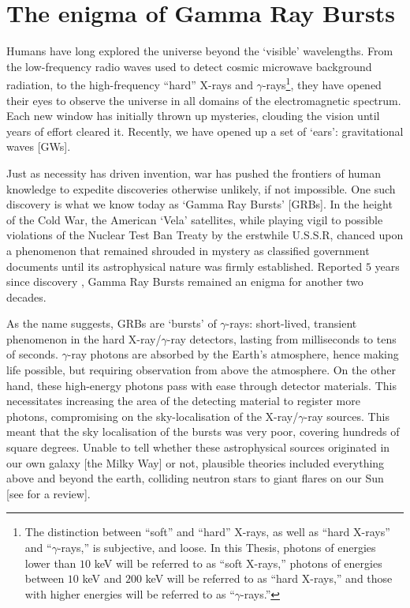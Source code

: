 \section{The enigma of Gamma Ray Bursts}
\label{sec:enigma}
Humans have long explored the universe beyond the `visible' wavelengths. From the low-frequency radio waves used to detect cosmic microwave background radiation, to the high-frequency ``hard'' X-rays and $\gamma$-rays\footnote{The distinction between ``soft'' and ``hard'' X-rays, as well as ``hard X-rays'' and ``$\gamma$-rays,'' is subjective, and loose. In this Thesis, photons of energies lower than $10$ keV will be referred to as ``soft X-rays,'' photons of energies between $10$ keV and $200$ keV will be referred to as ``hard X-rays,'' and those with higher energies will be referred to as ``$\gamma$-rays.''},  they have opened their eyes to observe the universe in all domains of the electromagnetic spectrum. Each new window has initially thrown up mysteries, clouding the vision until years of effort cleared it. Recently, we have opened up a set of `ears': gravitational waves [GWs].

Just as necessity has driven invention, war has pushed the frontiers of human knowledge to expedite discoveries otherwise unlikely, if not impossible. One such discovery is what we know today as `Gamma Ray Bursts' [GRBs]. In the height of the Cold War, the American `Vela' satellites, while playing vigil to possible violations of the Nuclear Test Ban Treaty by the erstwhile U.S.S.R, chanced upon a phenomenon that remained shrouded in mystery as classified government documents until its astrophysical nature was firmly established. Reported $5$ years since discovery \citep{Klebesadel_et_al.-1973-ApJL}, Gamma Ray Bursts remained an enigma for another two decades.

As the name suggests, GRBs are `bursts' of $\gamma$-rays: short-lived, transient phenomenon in the hard X-ray/$\gamma$-ray detectors, lasting from milliseconds to tens of seconds. $\gamma$-ray photons are absorbed by the Earth's atmosphere, hence making life possible, but requiring observation from above the atmosphere. On the other hand, these high-energy photons pass with ease through detector materials. This necessitates increasing the area of the detecting material to register more photons, compromising on the sky-localisation of the X-ray/$\gamma$-ray sources. This meant that the sky localisation of the bursts was very poor, covering hundreds of square degrees. Unable to tell whether these astrophysical sources originated in our own galaxy [the Milky Way] or not, plausible theories included everything above and beyond the earth, colliding neutron stars to giant flares on our Sun [see \cite{Nemiroff-1994-review} for a review].

